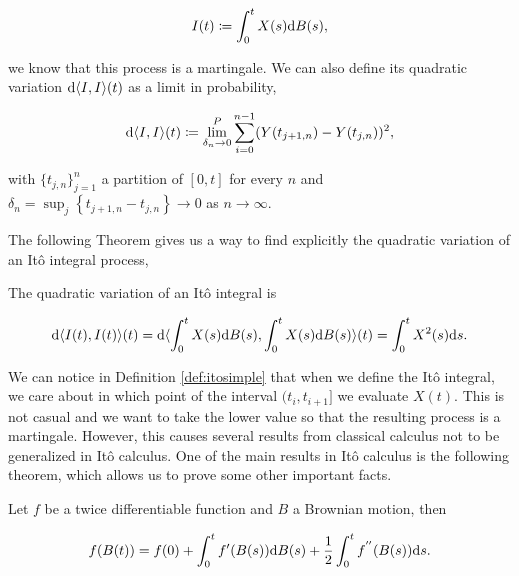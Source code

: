     \begin{equation*}
        I(t) \coloneqq \int_0^t X(s) \mathrm d B(s),
    \end{equation*}

\noindent we know that this process is a martingale. We can also define its quadratic variation $\mathrm d \langle I,I \rangle(t)$ as a limit in probability,

    \begin{equation*}
        \mathrm d \langle I,I \rangle(t) \coloneqq \lim^P_{\delta_n \to 0} \sum_{i=0}^{n-1} ( Y(t_{j+1,n}) - Y(t_{j,n}) )^2,
    \end{equation*}

    \noindent with $\{t_{j,n}\}_{j=1}^n$ a partition of $[0,t]$ for every $n$ and $\delta_n = \sup_j \left\{ t_{j+1,n} - t_{j,n} \right\} \to 0$ as $n\to \infty$.
    
    The following Theorem gives us a way to find explicitly the quadratic variation of an Itô integral process,

\begin{theorem}
    The quadratic variation of an Itô integral is

    \begin{equation*}
        \mathrm d \langle I(t),I(t)\rangle(t) = \mathrm d \langle \int_0^t X(s) \mathrm d B(s), \int_0^t X(s) \mathrm d B(s) \rangle(t) = \int_0^t X^2(s) \mathrm d s.
    \end{equation*}
\end{theorem}

We can notice in Definition \ref{def:itosimple} that when we define the Itô integral, we care about in which point of the interval $(t_{i},t_{i+1}]$ we evaluate $X(t)$. This is not casual and we want to take the lower value so that the resulting process is a martingale. However, this causes several results from classical calculus not to be generalized in Itô calculus. One of the main results in Itô calculus is the following theorem, which allows us to prove some other important facts.

\begin{theorem} \label{thm:ito_formula_brownian}
    Let $f$ be a twice differentiable function and $B$ a Brownian motion, then

    \begin{equation*}
        f(B(t)) = f(0) + \int_0^t f'(B(s)) \mathrm d B(s) + \frac12 \int_0^t f^{''}(B(s)) \mathrm d s.
    \end{equation*}
\end{theorem}

